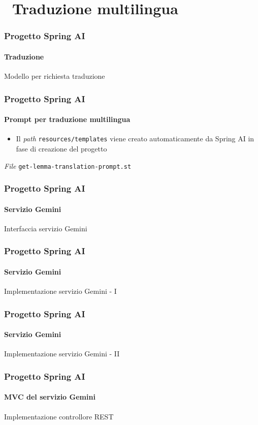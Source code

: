 \section{\faWrench\ Traduzione multilingua} %
\label{sec:spring-ai-gemini-zero-implicit-prompting-translation}
%
\begin{frame}[t,fragile] \frametitle{Progetto Spring AI}
    \framesubtitle{Traduzione}
        \begin{block}{Modello per richiesta traduzione}
			{\tiny}
    	\end{block}
\end{frame}
%
\begin{frame}[t,fragile] \frametitle{Progetto Spring AI}
    \framesubtitle{Prompt per traduzione multilingua}
        \begin{itemize}[leftmargin=10pt,align=right]
		    \item[\alert{\faExclamationTriangle}] Il \textit{path} \texttt{resources/templates} viene creato automaticamente da Spring AI in fase di creazione del progetto
        \end{itemize}
        \begin{block}{\textit{File} \texttt{get-lemma-translation-prompt.st}}
			{\scriptsize}
    	\end{block}
\end{frame}
%
\begin{frame}[t,fragile] \frametitle{Progetto Spring AI}
    \framesubtitle{Servizio Gemini}
        \begin{block}{Interfaccia servizio Gemini}
{\tiny}
    \end{block}
\end{frame}
%
\begin{frame}[t,fragile] \frametitle{Progetto Spring AI}
    \framesubtitle{Servizio Gemini}
		\vspace*{-.7cm}
        \begin{block}{Implementazione servizio Gemini - I}
            {\tiny}
    \end{block}
\end{frame}
%
\begin{frame}[t,fragile] \frametitle{Progetto Spring AI}
    \framesubtitle{Servizio Gemini}
    	\vspace*{-.7cm}
        \begin{block}{Implementazione servizio Gemini - II}
            {\tiny}
    \end{block}
\end{frame}
%
\begin{frame}[t,fragile] \frametitle{Progetto Spring AI}
    \framesubtitle{MVC del servizio Gemini}
    	\vspace*{-.7cm}
        \begin{block}{Implementazione controllore REST}
			{\tiny}
    	\end{block}
\end{frame}
%
